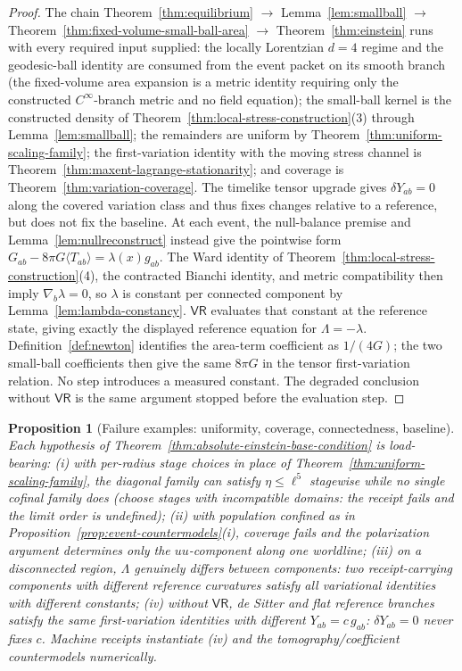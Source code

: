 \documentclass[11pt]{article}
\newtheorem{proposition}[theorem]{Proposition}
\begin{document}
\begin{proof}
The chain Theorem~\ref{thm:equilibrium} \(\to\) Lemma~\ref{lem:smallball}
\(\to\) Theorem~\ref{thm:fixed-volume-small-ball-area} \(\to\)
Theorem~\ref{thm:einstein} runs with every required input
supplied: the locally Lorentzian \(d=4\) regime and the geodesic-ball
identity are consumed from the event packet on its smooth branch (the
fixed-volume area expansion is a metric identity requiring only the
constructed \(C^\infty\)-branch metric and no field equation); the
small-ball kernel is the constructed density of
Theorem~\ref{thm:local-stress-construction}(3) through
Lemma~\ref{lem:smallball}; the remainders are uniform by
Theorem~\ref{thm:uniform-scaling-family}; the first-variation identity with
the moving stress channel is Theorem~\ref{thm:maxent-lagrange-stationarity};
and coverage is Theorem~\ref{thm:variation-coverage}. The timelike tensor
upgrade gives \(\delta Y_{ab}=0\) along the covered variation class and thus
fixes changes relative to a reference, but does not fix the baseline. At each
event, the null-balance premise and Lemma~\ref{lem:nullreconstruct} instead
give the pointwise form
\(G_{ab}-8\pi G\langle T_{ab}\rangle=\lambda(x)g_{ab}\). The Ward identity
of Theorem~\ref{thm:local-stress-construction}(4), the contracted Bianchi
identity, and metric compatibility then imply \(\nabla_b\lambda=0\), so
\(\lambda\) is constant per connected component by
Lemma~\ref{lem:lambda-constancy}. \(\mathsf{VR}\) evaluates that constant at
the reference state, giving exactly the displayed reference equation for
\(\Lambda=-\lambda\). Definition~\ref{def:newton} identifies the area-term
coefficient as \(1/(4G)\); the two small-ball coefficients then give the
same \(8\pi G\) in the tensor first-variation relation. No step introduces a
measured constant. The degraded conclusion without \(\mathsf{VR}\) is the same
argument stopped before the evaluation step.
\end{proof}

\begin{proposition}[Failure examples: uniformity, coverage, connectedness, baseline]
\label{prop:baseline-countermodels}
Each hypothesis of Theorem~\ref{thm:absolute-einstein-base-condition} is
load-bearing:
(i) with per-radius stage choices in place of
Theorem~\ref{thm:uniform-scaling-family}, the diagonal family can satisfy
\(\eta\leq\ell^5\) stagewise while no single cofinal family does (choose
stages with incompatible domains: the receipt fails and the limit order is
undefined);
(ii) with population confined as in
Proposition~\ref{prop:event-countermodels}(i), coverage fails and the
polarization argument determines only the \(uu\)-component along one
worldline;
(iii) on a disconnected region, \(\Lambda\) genuinely differs between
components: two receipt-carrying components with different reference
curvatures satisfy all variational identities with different constants;
(iv) without \(\mathsf{VR}\), de Sitter and flat reference branches satisfy
the \emph{same} first-variation identities with different \(Y_{ab}=c\,g_{ab}\):
\(\delta Y_{ab}=0\) never fixes \(c\). Machine receipts instantiate (iv) and
the tomography/coefficient countermodels numerically.
\end{proposition}
\end{document}
